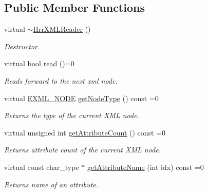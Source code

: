 \subsection*{Public Member Functions}
\begin{DoxyCompactItemize}
\item 
\mbox{\label{classirr_1_1io_1_1IIrrXMLReader_ad1d9faeae926afc224d9dea0ad7a08ac}} 
virtual \hyperlink{classirr_1_1io_1_1IIrrXMLReader_ad1d9faeae926afc224d9dea0ad7a08ac}{$\sim$\+I\+Irr\+X\+M\+L\+Reader} ()
\begin{DoxyCompactList}\small\item\em Destructor. \end{DoxyCompactList}\item 
virtual bool \hyperlink{classirr_1_1io_1_1IIrrXMLReader_a157f458f7dabeeff173f72a0fb443a8e}{read} ()=0
\begin{DoxyCompactList}\small\item\em Reads forward to the next xml node. \end{DoxyCompactList}\item 
\mbox{\label{classirr_1_1io_1_1IIrrXMLReader_a3482e8e6bdc15965fc6a0bcef6e9a8e0}} 
virtual \hyperlink{namespaceirr_1_1io_a86a02676c9cbb822e04d60c81b4f33ed}{E\+X\+M\+L\+\_\+\+N\+O\+DE} \hyperlink{classirr_1_1io_1_1IIrrXMLReader_a3482e8e6bdc15965fc6a0bcef6e9a8e0}{get\+Node\+Type} () const =0
\begin{DoxyCompactList}\small\item\em Returns the type of the current X\+ML node. \end{DoxyCompactList}\item 
virtual unsigned int \hyperlink{classirr_1_1io_1_1IIrrXMLReader_a8f85253d2efb15061facdb9571b9c549}{get\+Attribute\+Count} () const =0
\begin{DoxyCompactList}\small\item\em Returns attribute count of the current X\+ML node. \end{DoxyCompactList}\item 
virtual const char\+\_\+type $\ast$ \hyperlink{classirr_1_1io_1_1IIrrXMLReader_aa0807dc565c67fcf355e656df1a326ef}{get\+Attribute\+Name} (int idx) const =0
\begin{DoxyCompactList}\small\item\em Returns name of an attribute. \end{DoxyCompactList}\item 

\end{DoxyCompactItemize}
